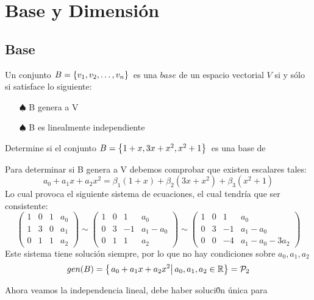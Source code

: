 \chapter{Base y Dimensión}

\section{Base}
\begin{dfn}[Base]
Un conjunto $B= \lbrace v_1, v_2, \ldots, v_n \rbrace$\ es una $base$ de un espacio vectorial $V$ si y s\'olo si satisface lo siguiente:
\begin{itemize}
\item[$\spadesuit$]B genera a V
\item[$\spadesuit$]B es linealmente independiente
\end{itemize}

\end{dfn}

\begin{ejemplo}
Determine si el conjunto $B= \left\{
1+x, 3x+x^2, x^2+1
 \right\} $\ es una base de \pdos
\end{ejemplo}
\sol
Para determinar si B genera a V debemos comprobar que existen escalares tales:~\\

\[a_0+a_1 x+a_2 x^2=
\beta_1(1+x)+
\beta_2(3x+x^2)+
\beta_3(x^2+1)
\]
Lo cual provoca el siguiente sistema de ecuaciones, el cual tendr\'ia que ser consistente:
\[
\left(
\begin{array}{rrr|r}
1&0&1&a_0\\
1&3&0&a_1\\
0&1&1&a_2
\end{array}
\right)
\sim
\left(
\begin{array}{rrr|r}
1&0&1&a_0\\
0&3&-1&a_1-a_0\\
0&1&1&a_2
\end{array}
\right)
\sim
\left(
\begin{array}{rrr|r}
1&0&1&a_0\\
0&3&-1&a_1-a_0\\
0&0&-4&a_1-a_0-3a_2
\end{array}
\right)
\]
Este sistema tiene soluci\'on siempre, por lo que no hay condiciones sobre $a_0, a_1, a_2$
\[gen(B)=
\left\{ \left. a_0+a_1 x+a_2 x^2\right| 
a_0, a_1, a_2 \in \mathbb{R}
 \right\}=\mathcal{P}_2
\]

Ahora veamos la independencia lineal, debe haber soluci\'0n \'unica para

